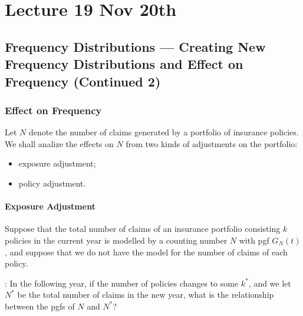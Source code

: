 \documentclass[notoc,notitlepage]{tufte-book}
\begin{document}


\chapter{Lecture 19 Nov 20th}%
\label{chp:lecture_19_nov_20th}

\section{Frequency Distributions --- Creating New Frequency Distributions and Effect on Frequency (Continued 2)}%
\label{sec:frequency_distributions_creating_new_frequency_distributions_and_effect_on_frequency_continued_2}

\subsection{Effect on Frequency}%
\label{sub:effect_on_frequency}

Let $N$ denote the number of claims generated by a portfolio of insurance policies. We shall analize the effects on $N$ from two kinds of adjustments on the portfolio:
\begin{itemize}
  \item exposure adjustment;
  \item policy adjustment.
\end{itemize}

\subsubsection{Exposure Adjustment}%
\label{ssub:exposure_adjustment}

Suppose that the total number of claims of an insurance portfolio consisting $k$ policies in the current year is modelled by a counting number $N$ with pgf $G_N(t)$, and suppose that we do not have the model for the number of claims of each policy.

: In the following year, if the number of policies changes to some $k^*$, and we let $N^*$ be the total number of claims in the new year, what is the relationship between the pgfs of $N$ and $N^*$?
\end{document}
